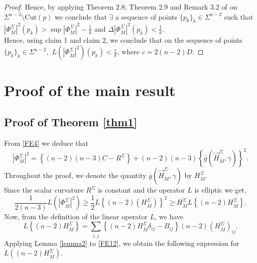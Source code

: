 \documentclass[11pt]{amsart}
\DeclareMathOperator{\Hessian}{Hess}
\numberwithin{equation}{section}
\begin{document}
\begin{proof}
Hence, by applying Theorem $2.8$, Theorem $2.9$ and Remark $3.2$ of \cite{aliasbook} on $\Sigma^{n-2}\setminus \text{Cut}(p)$ we conclude that $\exists$ a sequence of points $\{p_k\}_{k}\in \Sigma^{n-2}$ such that $|\Phi_{\overline{M}}^{\Sigma}|^2 (p_k)>\sup |\Phi_{\overline{M}}^{\Sigma}|^2-\frac{1}{k}$ and $\Delta |\Phi_{\overline{M}}^{\Sigma}|^2 (p_k)< \frac{1}{k}$.\\
Hence, using claim 1 and claim 2, we conclude that on the sequence of points $\{p_k\}_{k}\in \Sigma^{n-2},$ $L(|\Phi^{\Sigma}_{\overline{M}}|^2)(p_k)<\frac{c}{k}$, where $c=2(n-2)D$.
\end{proof}

\section{\textbf{Proof of the main result}}

\subsection{Proof of Theorem \ref{thm1} }

From \eqref{FE4} we deduce that 
\begin{equation*}
    \left|\Phi^{\Sigma}_{\overline{M}}\right|^2=\left\{(n-2)(n-3)C-R^{\Sigma}\right\}+(n-2)(n-3) \left\{\overline{g}\left(\vec{H}^{\Sigma}_{\overline{M}}, \gamma \right)\right\}^2.
\end{equation*}
Throughout the proof, we denote the quantity $\overline{g}\left(\vec{H}^{\Sigma}_{\overline{M}}, \gamma \right)$ by $H^{\Sigma}_{\overline{M}}$.\\
Since the scalar curvature $R^{\Sigma}$ is constant \cite{CSY} and the operator $L$ is elliptic we get,
\begin{equation}\label{FE18}
    \frac{1}{2(n-3)} L\left(\left|\Phi^{\Sigma}_{\overline{M}}\right|^2\right)\ge \frac{1}{2} L\left\{(n-2)\left(H^{\Sigma}_{\overline{M}}\right)\right\}^2\ge H^{\Sigma}_{\overline{M}} L\left\{(n-2)H^{\Sigma}_{\overline{M}}\right\}.
\end{equation}
Now, from the definition of the linear operator $L$, we have
\begin{equation}\label{FE12}
    L\left\{(n-2)H^{\Sigma}_{\overline{M}}\right\}=\sum_{i, j} \left\{(n-2) H^{\Sigma}_{\overline{M}} \delta_{ij}-B_{ij}\right\}(n-2) \left(H^{\Sigma}_{\overline{M}}\right)_{ij}.
\end{equation}
Applying Lemma \ref{lemma2} to \eqref{FE12}, we obtain the following expression for $L\left((n-2)H^{\Sigma}_{\overline{M}}\right)$.
\end{document}
